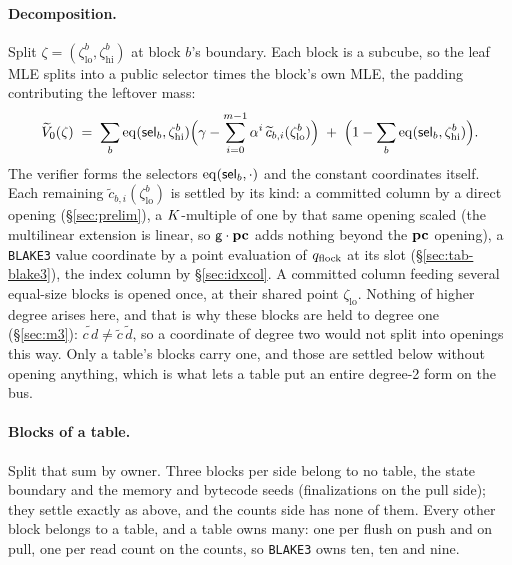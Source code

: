 \paragraph{Decomposition.} Split $\zeta=(\zeta^{b}_{\mathrm{lo}},\zeta^{b}_{\mathrm{hi}})$ at block $b$'s boundary. Each block is a subcube, so the leaf MLE splits into a public selector times the block's own MLE, the padding contributing the leftover mass:
\[
  \widetilde V_0(\zeta)\;=\;\sum_b \operatorname{eq}(\mathsf{sel}_b,\zeta^{b}_{\mathrm{hi}})\Bigl(\gamma-\sum_{i=0}^{m-1}\alpha^{i}\,\widetilde c_{b,i}(\zeta^{b}_{\mathrm{lo}})\Bigr)\;+\;\Bigl(1-\sum_b\operatorname{eq}(\mathsf{sel}_b,\zeta^{b}_{\mathrm{hi}})\Bigr).
\]
The verifier forms the selectors $\operatorname{eq}(\mathsf{sel}_b,\cdot)$ and the constant coordinates itself. Each remaining $\widetilde c_{b,i}(\zeta^{b}_{\mathrm{lo}})$ is settled by its kind: a committed column by a direct opening (\S\ref{sec:prelim}), a $K$-multiple of one by that same opening scaled (the multilinear extension is linear, so $\mathsf{g}\cdot\mathbf{pc}$ adds nothing beyond the $\mathbf{pc}$ opening), a \texttt{BLAKE3} value coordinate by a point evaluation of $q_{\mathrm{flock}}$ at its slot (\S\ref{sec:tab-blake3}), the index column by \S\ref{sec:idxcol}. A committed column feeding several equal-size blocks is opened once, at their shared point $\zeta_{\mathrm{lo}}$. Nothing of higher degree arises here, and that is why these blocks are held to degree one (\S\ref{sec:m3}): $\widetilde{c\,d} \neq \widetilde c\,\widetilde d$, so a coordinate of degree two would not split into openings this way. Only a table's blocks carry one, and those are settled below without opening anything, which is what lets a table put an entire degree-2 form on the bus.

\paragraph{Blocks of a table.} Split that sum by owner. Three blocks per side belong to no table, the state boundary and the memory and bytecode seeds (finalizations on the pull side); they settle exactly as above, and the counts side has none of them. Every other block belongs to a table, and a table owns many: one per flush on push and on pull, one per read count on the counts, so \texttt{BLAKE3} owns ten, ten and nine.

